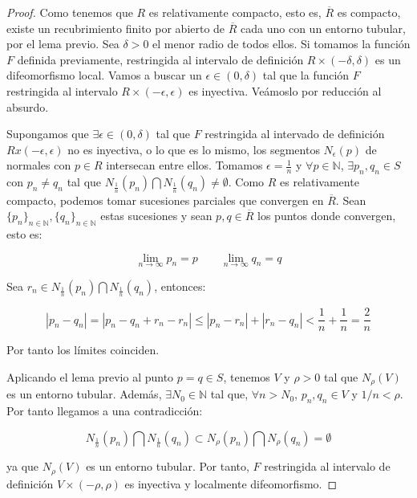 \begin{proof}
Como tenemos que $R$ es relativamente compacto, esto es, $\overline{R}$ es compacto, existe un recubrimiento finito por abierto de $\overline{R}$ cada uno con un entorno tubular, por el lema previo. Sea $\delta > 0$ el menor radio de todos ellos. Si tomamos la función $F$ definida previamente, restringida al intervalo de definición $R \times (-\delta, \delta)$ es un difeomorfismo local. Vamos a buscar un $\epsilon \in (0,\delta)$ tal que la función $F$ restringida al intervalo $R \times (-\epsilon, \epsilon)$ es inyectiva. Veámoslo por reducción al absurdo.

Supongamos que $\exists \epsilon \in (0,\delta)$ tal que $F$ restringida al intervado de definición $Rx(-\epsilon, \epsilon)$ no es inyectiva, o lo que es lo mismo, los segmentos $N_\epsilon(p)$ de normales con $p \in R$ intersecan entre ellos. Tomamos $\epsilon=\frac{1}{n}$ y $\forall p \in \mathbb{N}$, $\exists p_n,q_n \in S$ con $p_n \neq q_n$ tal que $N_{\frac{1}{n}}(p_n) \bigcap N_{\frac{1}{n}}(q_n) \neq \emptyset$.
Como $R$ es relativamente compacto, podemos tomar sucesiones parciales que convergen en $\overline{R}$. Sean $\{p_n\}_{n \in \mathbb{N}}, \{q_n\}_{n \in \mathbb{N}}$ estas sucesiones y sean $p,q \in \overline{R}$ los puntos donde convergen, esto es:

\begin{equation*}
    \lim_{n\to\infty} p_n = p \qquad \lim_{n\to\infty} q_n = q
\end{equation*}

Sea $r_n \in N_{\frac{1}{n}}(p_n) \bigcap N_{\frac{1}{n}}(q_n)$, entonces:

\begin{equation*}
    |p_n - q_n| = |p_n - q_n + r_n - r_n| \leq |p_n-r_n| + |r_n-q_n| < \frac{1}{n}+\frac{1}{n} = \frac{2}{n}
\end{equation*}

Por tanto los límites coinciden.

Aplicando el lema previo al punto $p = q \in S$, tenemos $V$ y $\rho > 0$ tal que $N_\rho(V)$ es un entorno tubular. Además, $\exists N_0 \in \mathbb{N}$ tal que, $\forall n > N_0$, $p_n,q_n \in V$ y $1/n < \rho$. Por tanto llegamos a una contradicción:

\begin{equation*}
    N_{\frac{1}{n}}(p_n) \bigcap N_{\frac{1}{n}}(q_n) \subset N_\rho(p_n)\bigcap N_\rho(q_n) = \emptyset
\end{equation*}

ya que $N_\rho(V)$ es un entorno tubular. Por tanto, $F$ restringida al intervalo de definición $V \times (-\rho, \rho)$ es inyectiva y localmente difeomorfismo.

\end{proof}

